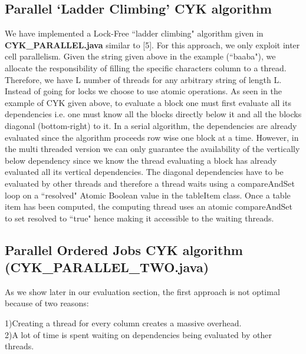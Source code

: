 \documentclass[12pt]{article}
\begin{document}
\subsection{Parallel ‘Ladder Climbing’ CYK algorithm}
We have implemented a Lock-Free ``ladder climbing" algorithm given in \\
{\bf CYK{\_}PARALLEL.java} similar to [5]. For this approach, we only exploit inter cell parallelism. Given the string given above in the example (``baaba"), we allocate the responsibility of filling the specific character\textsc{}s column to a thread. Therefore, we have L number of threads for any arbitrary string of length L. Instead of going for locks we choose to use atomic operations. As seen in the example of CYK given above, to evaluate a block one must first evaluate all its dependencies i.e.  one must know all the blocks directly below it and all the blocks diagonal (bottom-right) to it. In a serial algorithm, the dependencies are already evaluated since the algorithm proceeds row wise one block at a time. However, in the multi threaded version we can only guarantee the availability of the vertically below dependency since we know the thread evaluating a block has already evaluated all its vertical dependencies. The diagonal dependencies have to be evaluated by other threads and therefore a thread waits using a compareAndSet loop on a ``resolved" Atomic Boolean value in the tableItem class. Once a table item has been computed, the computing thread uses an atomic compareAndSet to set resolved to ``true" hence making it accessible to the waiting threads.\\
\subsection{Parallel Ordered Jobs CYK algorithm \\ (CYK{\_}PARALLEL{\_}TWO.java)}
As we show later in our evaluation section, the first approach is not optimal because of two reasons:

\vspace{5 mm}
1)Creating a thread for every column creates a massive overhead. \\

2)A lot of time is spent waiting on dependencies being evaluated by other threads. \\
\end{document}
